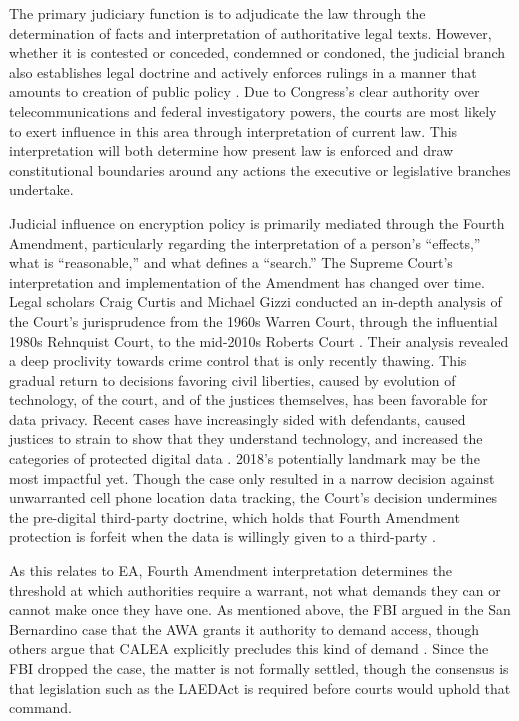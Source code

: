The primary judiciary function is to adjudicate the law through the determination of facts and interpretation of
authoritative legal texts. However, whether it is contested or conceded, condemned or condoned, the judicial branch also
establishes legal doctrine and actively enforces rulings in a manner that amounts to creation of public policy
\cite{feeley_judicial_2000}. Due to Congress's clear authority over telecommunications and federal investigatory powers,
the courts are most likely to exert influence in this area through interpretation of current law. This interpretation
will both determine how present law is enforced and draw constitutional boundaries around any actions the executive or
legislative branches undertake.

Judicial influence on encryption policy is primarily mediated through the Fourth Amendment, particularly regarding the
interpretation of a person's ``effects,'' what is ``reasonable,'' and what defines a ``search.'' The Supreme Court's
interpretation and implementation of the Amendment has changed over time. Legal scholars Craig Curtis and Michael Gizzi
conducted an in-depth analysis of the Court's jurisprudence from the 1960s Warren Court, through the influential 1980s
Rehnquist Court, to the mid-2010s Roberts Court \cite{gizzi_fourth_2016}. Their analysis revealed a deep proclivity
towards crime control that is only recently thawing. This gradual return to decisions favoring civil liberties, caused
by evolution of technology, of the court, and of the justices themselves, has been favorable for data privacy. Recent
cases have increasingly sided with defendants, caused justices to strain to show that they understand technology, and
increased the categories of protected digital data \cite{gizzi_fourth_2016}. 2018's potentially landmark  may be the most impactful yet. Though the case only resulted in a narrow decision against unwarranted
cell phone location data tracking, the Court's decision undermines the pre-digital third-party doctrine, which holds
that Fourth Amendment protection is forfeit when the data is willingly given to a third-party \cite{franklin_2018}.

As this relates to \ac{EA}, Fourth Amendment interpretation determines the threshold at which authorities require a
warrant, not what demands they can or cannot make once they have one. As mentioned above, the FBI argued in the San
Bernardino case that the \ac{AWA} grants it authority to demand access, though others argue that \acs{CALEA} explicitly
precludes this kind of demand \cite{gidari_2016}. Since the FBI dropped the case, the matter is not formally settled,
though the consensus is that legislation such as the \ac{LAEDAct} is required before courts would uphold that command.

